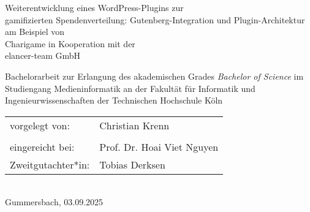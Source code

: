 \begin{titlepage}
%
\sffamily%
%
\begin{center}
\end{center}
%
\vfill
%
\begin{huge}
    Weiterentwicklung eines WordPress-Plugins zur \\gamifizierten Spendenverteilung:
    Gutenberg-Integration und Plugin-Architektur am Beispiel von \\\grqq{}Charigame\grqq{} in Kooperation mit der \\elancer-team GmbH\\[10mm]
\end{huge}
%
Bachelorarbeit zur Erlangung des akademischen Grades\newline
\emph{Bachelor of Science}\newline
im Studiengang Medieninformatik\newline
an der Fakultät für Informatik und Ingenieurwissenschaften\newline
der Technischen Hochschule Köln
%
\vfill
%
\begin{tabular}{@{}ll}
vorgelegt von: & Christian Krenn\\
               \\[5mm]
eingereicht bei:   & Prof. Dr. Hoai Viet Nguyen\\
Zweitgutachter*in: & Tobias Derksen
\end{tabular}	
%
\\[10mm]
%
Gummersbach, 03.09.2025%
%
\rmfamily%
%
\end{titlepage}